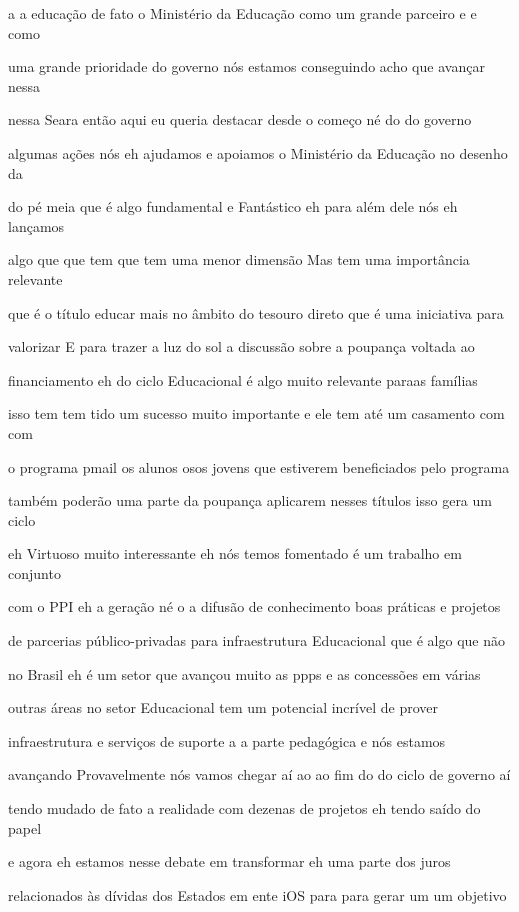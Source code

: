 \documentclass[a4paper,12pt]{article}
\begin{document}
a a educação de fato o Ministério da Educação como um grande parceiro e e como

uma grande prioridade do governo nós estamos conseguindo acho que avançar nessa

nessa Seara então aqui eu queria destacar desde o começo né do do governo

algumas ações nós eh ajudamos e apoiamos o Ministério da Educação no desenho da

do pé meia que é algo fundamental e Fantástico eh para além dele nós eh lançamos

algo que que tem que tem uma menor dimensão Mas tem uma importância relevante

que é o título educar mais no âmbito do tesouro direto que é uma iniciativa para

valorizar E para trazer a luz do sol a discussão sobre a poupança voltada ao

financiamento eh do ciclo Educacional é algo muito relevante paraas famílias

isso tem tem tido um sucesso muito importante e ele tem até um casamento com com

o programa pmail os alunos osos jovens que estiverem beneficiados pelo programa

também poderão uma parte da poupança aplicarem nesses títulos isso gera um ciclo

eh Virtuoso muito interessante eh nós temos fomentado é um trabalho em conjunto

com o PPI eh a geração né o a difusão de conhecimento boas práticas e projetos

de parcerias público-privadas para infraestrutura Educacional que é algo que não

no Brasil eh é um setor que avançou muito as ppps e as concessões em várias

outras áreas no setor Educacional tem um potencial incrível de prover

infraestrutura e serviços de suporte a a parte pedagógica e nós estamos

avançando Provavelmente nós vamos chegar aí ao ao fim do do ciclo de governo aí

tendo mudado de fato a realidade com dezenas de projetos eh tendo saído do papel

e agora eh estamos nesse debate em transformar eh uma parte dos juros

relacionados às dívidas dos Estados em ente iOS para para gerar um um objetivo
\end{document}
